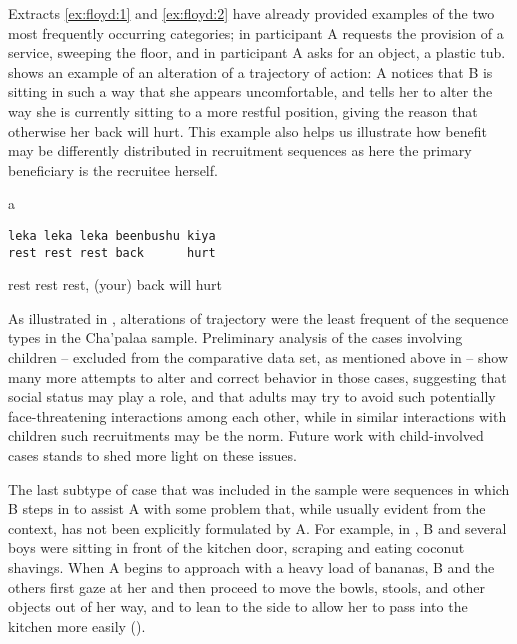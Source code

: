 \documentclass[output=paper]{langsci/langscibook}
\begin{document}
Extracts \ref{ex:floyd:1} and \ref{ex:floyd:2} have already provided examples of the two most frequently occurring categories; in  participant A requests the provision of a service, sweeping the floor, and in  participant A asks for an object, a plastic tub.  shows an example of an alteration of a trajectory of action: A notices that B is sitting in such a way that she appears uncomfortable, and tells her to alter the way she is currently sitting to a more restful position, giving the reason that otherwise her back will hurt. This example also helps us illustrate how benefit may be differently distributed in recruitment sequences as here the primary beneficiary is the recruitee herself.

\vspace{-1mm}
%
\begin{mdframednoverticalspace}[style=firstfoc]
\begin{transbox}{1}{a}
\begin{verbatim}
leka leka leka beenbushu kiya
rest rest rest back      hurt
\end{verbatim}
rest rest rest, (your) back will hurt
\end{transbox}
\end{mdframednoverticalspace}
%
\begin{mdframednoverticalspace}[style=secondfoc]
\end{mdframednoverticalspace}

As illustrated in , alterations of trajectory were the least frequent of the sequence types in the Cha'palaa sample. Preliminary analysis of the cases involving children -- excluded from the comparative data set, as mentioned above in  -- show many more attempts to alter and correct behavior in those cases, suggesting that social status may play a role, and that adults may try to avoid such potentially face-threatening interactions among each other, while in similar interactions with children such recruitments may be the norm. Future work with child-involved cases stands to shed more light on these issues.

The last subtype of case that was included in the sample were sequences in which B steps in to assist A with some problem that, while usually evident from the context, has not been explicitly formulated by A. For example, in , B and several boys were sitting in front of the kitchen door, scraping and eating coconut shavings. When A begins to approach with a heavy load of bananas, B and the others first gaze at her and then proceed to move the bowls, stools, and other objects out of her way, and to lean to the side to allow her to pass into the kitchen more easily ().
\end{document}
